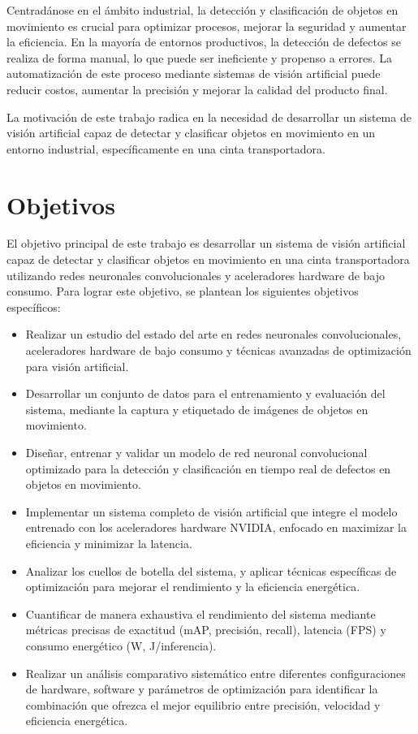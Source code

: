 \documentclass[11pt,spanish,listoffigures,listoftables]{tfgetsinf}
\begin{document}
Centradánose en el ámbito industrial, la detección y clasificación de objetos en movimiento es crucial para optimizar procesos, mejorar la seguridad y aumentar la eficiencia. En la mayoría de entornos productivos, la detección de defectos se realiza de forma manual, lo que puede ser ineficiente y propenso a errores. La automatización de este proceso mediante sistemas de visión artificial puede reducir costos, aumentar la precisión y mejorar la calidad del producto final.


La motivación de este trabajo radica en la necesidad de desarrollar un sistema de visión artificial capaz de detectar y clasificar objetos en movimiento en un entorno industrial, específicamente en una cinta transportadora.


\section{Objetivos}

El objetivo principal de este trabajo es desarrollar un sistema de visión artificial capaz de detectar y clasificar objetos en movimiento en una cinta transportadora utilizando redes neuronales convolucionales y aceleradores hardware de bajo consumo. Para lograr este objetivo, se plantean los siguientes objetivos específicos:

\begin{itemize}
   \item Realizar un estudio del estado del arte en redes neuronales convolucionales, aceleradores hardware de bajo consumo y técnicas avanzadas de optimización para visión artificial.
   \item Desarrollar un conjunto de datos para el entrenamiento y evaluación del sistema, mediante la captura y etiquetado de imágenes de objetos en movimiento.
   \item Diseñar, entrenar y validar un modelo de red neuronal convolucional optimizado para la detección y clasificación en tiempo real de defectos en objetos en movimiento.
   \item Implementar un sistema completo de visión artificial que integre el modelo entrenado con los aceleradores hardware NVIDIA, enfocado en maximizar la eficiencia y minimizar la latencia.
   \item Analizar los cuellos de botella del sistema, y aplicar técnicas específicas de optimización para mejorar el rendimiento y la eficiencia energética.
   \item Cuantificar de manera exhaustiva el rendimiento del sistema mediante métricas precisas de exactitud (mAP, precisión, recall), latencia (FPS) y consumo energético (W, J/inferencia).
   \item Realizar un análisis comparativo sistemático entre diferentes configuraciones de hardware, software y parámetros de optimización para identificar la combinación que ofrezca el mejor equilibrio entre precisión, velocidad y eficiencia energética.
\end{itemize}
\end{document}
